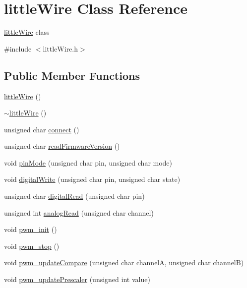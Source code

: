 \hypertarget{classlittleWire}{\section{little\-Wire \-Class \-Reference}
\label{classlittleWire}
}


\hyperlink{classlittleWire}{little\-Wire} class  




{\ttfamily \#include $<$little\-Wire.\-h$>$}

\subsection*{\-Public \-Member \-Functions}
\begin{DoxyCompactItemize}
\item 
\hyperlink{classlittleWire_a48b8616a5add99022a556a9a839e31b2}{little\-Wire} ()
\item 
\hyperlink{classlittleWire_ae18d45d978ab1862b98db53d7e2634b1}{$\sim$little\-Wire} ()
\item 
unsigned char \hyperlink{classlittleWire_ab27313730210db2f7bf6e2f080433b57}{connect} ()
\item 
unsigned char \hyperlink{classlittleWire_abd208452c78384fa4b7323ad5038f3bd}{read\-Firmware\-Version} ()
\item 
void \hyperlink{group__GPIO_gaf657af6bcf549893b5fd7df1049dabc8}{pin\-Mode} (unsigned char pin, unsigned char mode)
\item 
void \hyperlink{group__GPIO_ga896fb0c440930e3e7ea8ed39577338a2}{digital\-Write} (unsigned char pin, unsigned char state)
\item 
unsigned char \hyperlink{group__GPIO_ga203436de9031afe3e82412f6d2045fe1}{digital\-Read} (unsigned char pin)
\item 
unsigned int \hyperlink{group__ADC_ga7167a646d71cc3ad8700c0d084d1c22a}{analog\-Read} (unsigned char channel)
\item 
void \hyperlink{group__PWM_gacf483e7e2f583aa03f3c04b7679f8154}{pwm\-\_\-init} ()
\item 
void \hyperlink{group__PWM_gae271ef531c63a6c4739ac0b74f6a9b32}{pwm\-\_\-stop} ()
\item 
void \hyperlink{group__PWM_ga49de16d3d4d1d12ff9be1e86fbdf4d77}{pwm\-\_\-update\-Compare} (unsigned char channel\-A, unsigned char channel\-B)
\item 
void \hyperlink{group__PWM_ga00985706f6aa20cad938832f6d3303d7}{pwm\-\_\-update\-Prescaler} (unsigned int value)

\end{DoxyCompactItemize}
